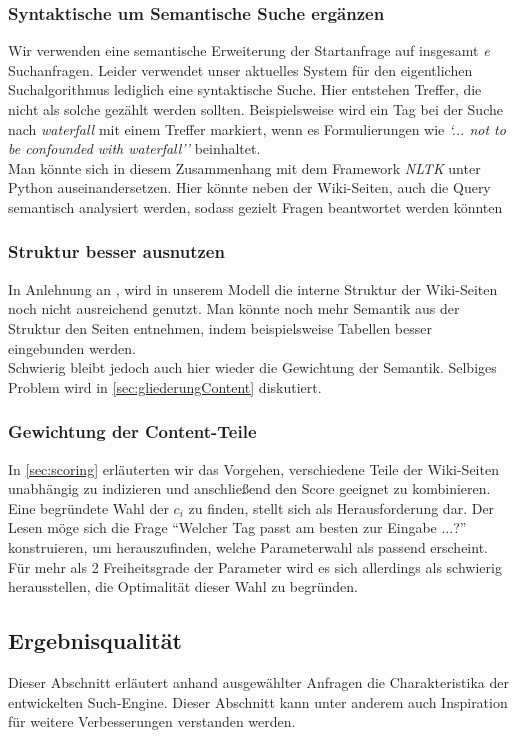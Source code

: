 \documentclass[12pt,pdftex,a4paper]{article}
\begin{document}
\subsubsection{Syntaktische um Semantische Suche ergänzen}\label{sec:semantikInSuche}
Wir verwenden eine semantische Erweiterung der Startanfrage auf insgesamt \textit{e} Suchanfragen. Leider verwendet unser aktuelles System für den eigentlichen Suchalgorithmus lediglich eine syntaktische Suche. Hier entstehen Treffer, die nicht als solche gezählt werden sollten. Beispielsweise wird ein Tag bei der Suche nach \textit{waterfall} mit einem Treffer markiert, wenn es Formulierungen wie \textit{`... not to be confounded with waterfall''} beinhaltet.\\
Man könnte sich in diesem Zusammenhang mit dem Framework \textit{NLTK} unter Python auseinandersetzen. Hier könnte neben der Wiki-Seiten, auch die Query semantisch analysiert werden, sodass gezielt Fragen beantwortet werden könnten
\subsubsection{Struktur besser ausnutzen}
In Anlehnung an , wird in unserem Modell die interne Struktur der Wiki-Seiten noch nicht ausreichend genutzt. Man könnte noch mehr Semantik aus der Struktur den Seiten entnehmen, indem beispielsweise Tabellen besser eingebunden werden. \\
Schwierig bleibt jedoch auch hier wieder die Gewichtung der Semantik. Selbiges Problem wird in \autoref{sec:gliederungContent} diskutiert.
\subsubsection{Gewichtung der Content-Teile}
\label{sec:gliederungContent}
In \autoref{sec:scoring} erläuterten wir das Vorgehen, verschiedene Teile der Wiki-Seiten unabhängig zu indizieren und anschließend den Score geeignet zu kombinieren. Eine begründete Wahl der $c_i$ zu finden, stellt sich als Herausforderung dar. Der Lesen möge sich die Frage ``Welcher Tag passt am besten zur Eingabe ...?'' konstruieren, um herauszufinden, welche Parameterwahl als passend erscheint. \\
Für mehr als 2 Freiheitsgrade der Parameter wird es sich allerdings als schwierig herausstellen, die Optimalität dieser Wahl zu begründen.



\subsection{Ergebnisqualität}
Dieser Abschnitt erläutert anhand ausgewählter Anfragen die Charakteristika der entwickelten Such-Engine. Dieser Abschnitt kann unter anderem auch Inspiration für weitere Verbesserungen verstanden werden.
\end{document}
